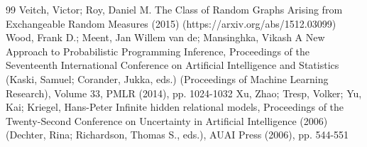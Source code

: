 \documentclass[10pt]{amsart}
\theoremstyle{definition}\newtheorem{defi}[theo]{Definition}\newtheorem{rema}[theo]{Remark}\newtheorem{exam}[theo]{Example}\newtheorem{exem}[theo]{Example}\newtheorem{nota}[theo]{Notation}
\begin{document}
\begin{thebibliography}{99}
Veitch, Victor; Roy, Daniel M. The Class of Random Graphs Arising from Exchangeable Random Measures (2015) (https://arxiv.org/abs/1512.03099)
Wood, Frank D.; Meent, Jan Willem van de; Mansinghka, Vikash A New Approach to Probabilistic Programming Inference, Proceedings of the Seventeenth International Conference on Artificial Intelligence and Statistics (Kaski, Samuel; Corander, Jukka, eds.) (Proceedings of Machine Learning Research), Volume 33, PMLR (2014), pp. 1024-1032
Xu, Zhao; Tresp, Volker; Yu, Kai; Kriegel, Hans-Peter Infinite hidden relational models, Proceedings of the Twenty-Second Conference on Uncertainty in Artificial Intelligence (2006) (Dechter, Rina; Richardson, Thomas S., eds.), AUAI Press (2006), pp. 544-551
\end{thebibliography}
\end{document}
